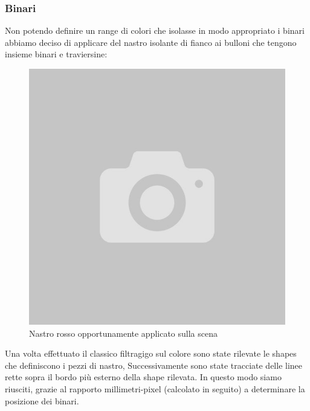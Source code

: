 \documentclass[twoside]{supsistudent}
\begin{document}
\subsubsection{Binari}
Non potendo definire un range di colori che isolasse in modo appropriato i binari abbiamo deciso di applicare del nastro isolante di fianco ai bulloni
che tengono insieme binari e traviersine: 
\begin{figure}[H]
  \center
  \includegraphics[scale=0.40]{images/empty.jpg}
  \caption{Nastro rosso opportunamente applicato sulla scena}
\end{figure}
Una volta effettuato il classico filtragigo sul colore sono state rilevate le shapes che definiscono i pezzi di nastro, 
Successivamente sono state tracciate delle linee rette sopra il bordo più esterno della shape rilevata. In questo modo siamo 
riusciti, grazie al rapporto millimetri-pixel (calcolato in seguito) a determinare la posizione dei binari. 
\end{document}
